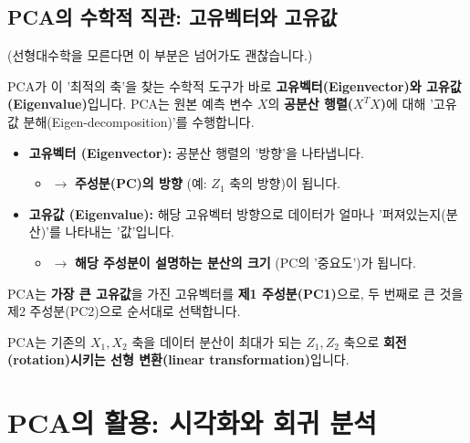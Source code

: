 \documentclass[11pt,a4paper]{book}
\theoremstyle{definition}
\begin{document}
\subsection{PCA의 수학적 직관: 고유벡터와 고유값}
(선형대수학을 모른다면 이 부분은 넘어가도 괜찮습니다.)

PCA가 이 '최적의 축'을 찾는 수학적 도구가 바로 \textbf{고유벡터(Eigenvector)와 고유값(Eigenvalue)}입니다.
PCA는 원본 예측 변수 $X$의 \textbf{공분산 행렬($X^T X$)}에 대해 '고유값 분해(Eigen-decomposition)'를 수행합니다.

\begin{itemize}
    \item \textbf{고유벡터 (Eigenvector):} 공분산 행렬의 '방향'을 나타냅니다.
        \begin{itemize}
            \item $\rightarrow$ \textbf{주성분(PC)의 방향} (예: $Z_1$ 축의 방향)이 됩니다.
        \end{itemize}
    \item \textbf{고유값 (Eigenvalue):} 해당 고유벡터 방향으로 데이터가 얼마나 '퍼져있는지(분산)'를 나타내는 '값'입니다.
        \begin{itemize}
            \item $\rightarrow$ \textbf{해당 주성분이 설명하는 분산의 크기} (PC의 '중요도')가 됩니다.
        \end{itemize}
\end{itemize}
PCA는 \textbf{가장 큰 고유값}을 가진 고유벡터를 \textbf{제1 주성분(PC1)}으로, 두 번째로 큰 것을 제2 주성분(PC2)으로 순서대로 선택합니다.

\begin{keyconcept}[title={PCA는 '회전'이다}]
PCA는 기존의 $X_1, X_2$ 축을 데이터 분산이 최대가 되는 $Z_1, Z_2$ 축으로 \textbf{회전(rotation)시키는 선형 변환(linear transformation)}입니다.
\end{keyconcept}


\section{PCA의 활용: 시각화와 회귀 분석}
\end{document}
